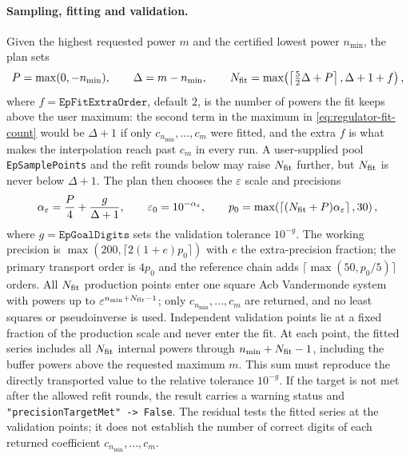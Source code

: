 \documentclass[11pt,a4paper]{article}
\numberwithin{table}{section}
\begin{document}
\paragraph{Sampling, fitting and validation.}
Given the highest requested power $m$ and the certified lowest power $n_{\min}$, the plan sets
\begin{equation}
  P=\max(0,-n_{\min}),\qquad
  \Delta=m-n_{\min},\qquad
  N_{\rm fit}=\max\!\left(\left\lceil\tfrac52\Delta+P\right\rceil,\Delta+1+f\right),
  \label{eq:regulator-fit-count}
\end{equation}
where $f=\texttt{EpFitExtraOrder}$, default $2$, is the number of powers the fit keeps above the
user maximum: the second term in the maximum in \eqref{eq:regulator-fit-count} would be $\Delta+1$ if
only $c_{n_{\min}},\ldots,c_m$ were fitted, and the extra $f$ is what makes the interpolation reach
past $c_m$ in every run. A user-supplied pool \texttt{EpSamplePoints} and the refit rounds below may
raise $N_{\rm fit}$ further, but $N_{\rm fit}$ is never below $\Delta+1$.
The plan then chooses the $\varepsilon$ scale and precisions
\begin{equation}
  \alpha_\varepsilon=\frac{P}{4}+\frac{g}{\Delta+1},\qquad
  \varepsilon_0=10^{-\alpha_\varepsilon},\qquad
  p_0=\max\!\left(\left\lceil(N_{\rm fit}+P)\alpha_\varepsilon\right\rceil,30\right),
  \label{eq:regulator-scale-precision}
\end{equation}
where $g=\texttt{EpGoalDigits}$ sets the validation tolerance $10^{-g}$. The working precision is
$\max(200,\lceil2(1+e)p_0\rceil)$ with $e$ the extra-precision fraction; the primary
transport order is $4p_0$ and the reference chain adds
$\lceil\max(50,p_0/5)\rceil$ orders. All $N_{\rm fit}$ production points enter one square
Acb Vandermonde system with powers up to $\varepsilon^{n_{\min}+N_{\rm fit}-1}$; only
$c_{n_{\min}},\ldots,c_m$ are returned, and no least squares or pseudoinverse is used.
Independent validation points lie at a fixed fraction of the production scale and never enter
the fit. At each point, the fitted series includes all $N_{\rm fit}$ internal powers through
$n_{\min}+N_{\rm fit}-1$, including the buffer powers above the requested maximum $m$.
This sum must reproduce the directly transported value to the relative tolerance $10^{-g}$. If the target
is not met after the allowed refit rounds, the result carries a warning status and
\texttt{"precisionTargetMet" -> False}. The residual tests the fitted series at the validation
points; it does not establish the number of correct digits of each returned coefficient
$c_{n_{\min}},\ldots,c_m$.
\end{document}
